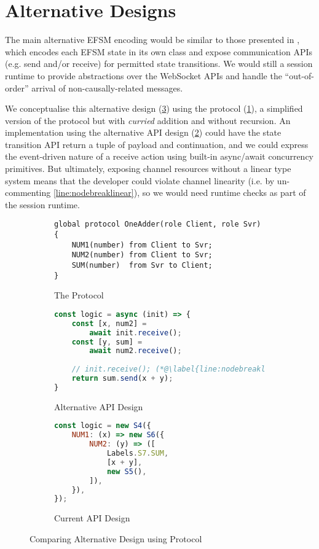 \section{Alternative Designs}
\label{section:nodealt}

The main alternative EFSM encoding would be similar to those
presented in \cite{Hybrid2016}, which encodes
each EFSM state in its own class 
and expose communication APIs (e.g. send and/or receive) 
for permitted state transitions.
We would still a session runtime to provide
abstractions over the WebSocket APIs and handle the 
``out-of-order'' arrival of non-causally-related messages.

We conceptualise this alternative design (\cref{fig:nodealt})
using the  protocol (\cref{subfig:oneadder}), 
a simplified version of the  protocol 
but with \textit{curried} addition and without recursion.
An implementation using the alternative API design
(\cref{subfig:oneadderalt}) could have the state transition 
API return a tuple of payload and continuation,
and we could express the event-driven nature of a receive action
using built-in async/await concurrency primitives.
But ultimately, exposing channel resources without a linear type system
means that the developer could violate channel linearity
(i.e. by un-commenting \cref{line:nodebreaklinear}), 
so we would need runtime checks as part of the session runtime.

\begin{figure}[!h]
\centering
\begin{subfigure}{\textwidth}
\begin{lstlisting}[language=scribble]
global protocol OneAdder(role Client, role Svr) {
	NUM1(number) from Client to Svr;
	NUM2(number) from Client to Svr;
	SUM(number)  from Svr to Client;
}
\end{lstlisting}
\caption{The  Protocol}
\label{subfig:oneadder}
\end{subfigure}
\begin{subfigure}{0.49\textwidth}
\begin{lstlisting}[language=javascript,tabsize=2]
const logic = async (init) => {
	const [x, num2] = 
		await init.receive();
 	const [y, sum] = 
 		await num2.receive();
 		
 	// init.receive(); (*@\label{line:nodebreaklinear}@*)
	return sum.send(x + y);
}
\end{lstlisting}
\caption{Alternative API Design}
\label{subfig:oneadderalt}
\end{subfigure}
\hfill
\begin{subfigure}{0.49\textwidth}
\begin{lstlisting}[language=javascript,tabsize=2]
const logic = new S4({
	NUM1: (x) => new S6({
		NUM2: (y) => ([
			Labels.S7.SUM,
			[x + y],
			new S5(),
		]),
	}),
});
\end{lstlisting}
\caption{Current API Design}
\end{subfigure}
\caption{Comparing Alternative \nodecodegen
Design using  Protocol}
\label{fig:nodealt}
\end{figure}

